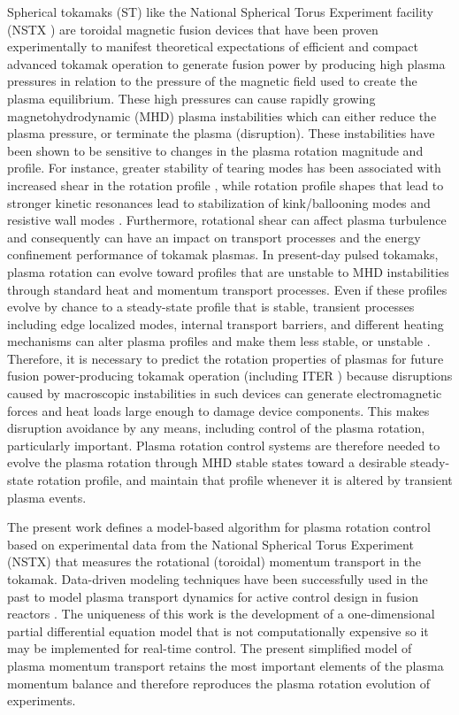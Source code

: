 \documentclass[12pt]{iopart}
\begin{document}
Spherical tokamaks (ST) like the National Spherical Torus Experiment facility (NSTX  \cite{Ono00}) are toroidal magnetic fusion devices that have been proven experimentally to manifest theoretical expectations of efficient and compact advanced tokamak operation to generate fusion power by producing high plasma pressures in relation to the pressure of the magnetic field used to create the plasma equilibrium. These high pressures can cause rapidly growing magnetohydrodynamic (MHD) plasma instabilities which can either reduce the plasma pressure, or terminate the plasma (disruption). 
These instabilities have been shown to be sensitive to changes in the plasma rotation magnitude and profile. For instance, greater stability of tearing modes has been associated with increased shear in the rotation profile \cite{Gerhardt09, Park13}, while rotation profile shapes that lead to stronger kinetic resonances lead to stabilization of kink/ballooning modes and resistive wall modes \cite{Sabbagh10, Berkery10}. Furthermore, rotational shear can affect plasma turbulence and consequently can have an impact on transport processes and the energy confinement performance of tokamak plasmas. In present-day pulsed tokamaks, plasma rotation can evolve toward profiles that are unstable to MHD instabilities through standard heat and momentum transport processes. Even if these profiles evolve by chance to a steady-state profile that is stable, transient processes including edge localized modes, internal transport barriers, and different heating mechanisms can alter plasma profiles and make them less stable, or unstable \cite{Sabbagh13}.
Therefore, it is necessary to predict the rotation properties of plasmas for future fusion power-producing tokamak operation (including ITER \cite{Hender07}) because disruptions caused by macroscopic instabilities in such devices can generate electromagnetic forces and heat loads large enough to damage device components. This makes disruption avoidance by any means, including control of the plasma rotation, particularly important. Plasma rotation control systems are therefore needed to evolve the plasma rotation through MHD stable states toward a desirable steady-state rotation profile, and maintain that profile whenever it is altered by transient plasma events.

The present work defines a model-based algorithm for plasma rotation control based on experimental data from the National Spherical Torus Experiment (NSTX) \cite{Ono00} that measures the rotational (toroidal) momentum transport in the tokamak. Data-driven modeling techniques have been successfully used in the past to model plasma transport dynamics for active control design in fusion reactors \cite{Moreau13, Boyer133, Boyer144}. The uniqueness of this work is the development of a one-dimensional partial differential equation model that is not computationally expensive so it may be implemented for real-time control.  
The present simplified model of plasma momentum transport retains the most important elements of the plasma momentum balance and therefore reproduces the plasma rotation evolution of experiments.
 
\end{document}
